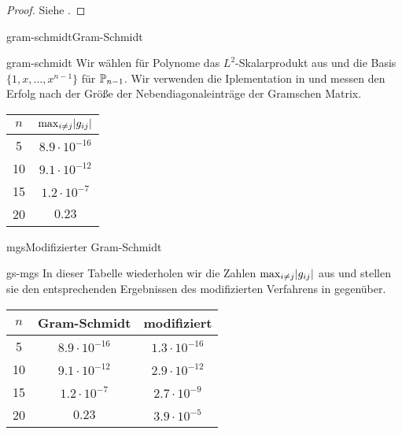 \begin{proof}
  Siehe \cite{Rannacher17}.
\end{proof}

\begin{Algorithmus*}{gram-schmidt}{Gram-Schmidt}
  
\end{Algorithmus*}

\begin{Beispiel}{gram-schmidt}
  Wir wählen für Polynome das $L^2$-Skalarprodukt aus
   und die Basis $\{1,x,\dots,x^{n-1}\}$
  für $\P_{n-1}$. Wir verwenden die Iplementation in
   und messen den Erfolg nach der
  Größe der Nebendiagonaleinträge der Gramschen Matrix.
  \begin{center}
    \begin{tabular}{c|c}
      $n$ & $\max_{i\neq j} \abs{g_{ij}}$ \\
      \hline
      5 & $8.9\cdot 10^{-16}$ \\
      10 & $9.1\cdot 10^{-12}$ \\
      15 & $1.2\cdot 10^{-7}$ \\
      20 & $0.23$
    \end{tabular}
  \end{center}
\end{Beispiel}

\begin{Algorithmus*}{mgs}{Modifizierter Gram-Schmidt}
    
\end{Algorithmus*}

\begin{Beispiel}{gs-mgs}
  In dieser Tabelle wiederholen wir die Zahlen
  $\max_{i\neq j} \abs{g_{ij}}$ aus 
  und stellen sie den entsprechenden Ergebnissen des modifizierten
  Verfahrens in  gegenüber.
  \begin{center}
    \begin{tabular}{c|cc}
      $n$ &  Gram-Schmidt & modifiziert\\
      \hline
      5 & $8.9\cdot 10^{-16}$ & $1.3\cdot 10^{-16}$ \\
      10 & $9.1\cdot 10^{-12}$ & $2.9\cdot 10^{-12}$ \\
      15 & $1.2\cdot 10^{-7}$ & $2.7\cdot 10^{-9}$ \\
      20 & $0.23$ & $3.9\cdot 10^{-5}$
    \end{tabular}
  \end{center}
\end{Beispiel}

